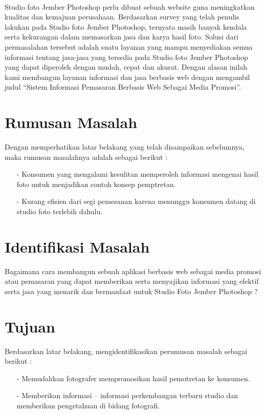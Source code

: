 \documentclass{jtetiproposalskripsi}
\begin{document}
\paragraph{}
Studio foto Jember Photoshop perlu dibuat sebuah website guna meningkatkan kualitas dan kemajuan perusahaan. Berdasarkan survey yang telah penulis lakukan pada Studio foto Jember Photoshop,  ternyata  masih  banyak kendala  serta  kekurangan dalam memasarkan jasa dan karya hasil foto. Solusi dari permasalahan tersebut adalah suatu layanan yang mampu menyediakan semua informasi tentang jasa-jasa yang tersedia  pada Studio foto Jember Photoshop yang dapat diperoleh dengan mudah, cepat dan akurat. Dengan alasan inilah kami membangun layanan informasi dan jasa berbasis web dengan mengambil  judul “Sistem Informasi Pemasaran Berbasis Web Sebagai Media Promosi”.



\section{Rumusan Masalah}
Dengan memperhatikan latar belakang yang telah disampaikan sebelumnya, maka rumusan masalahnya adalah sebagai berikut : 
\begin{itemize}
\item[-]Konsumen yang mengalami kesulitan memperoleh  informasi  mengenai hasil foto untuk menjadikan contoh konsep pemptretan.
\item[-]Kurang efisien dari segi pemesanan karena menunggu konsumen datang di studio foto terlebih dahulu.
\end{itemize}

\section{Identifikasi Masalah}
Bagaimana  cara  membangun  sebuah  aplikasi  berbasis web sebagai  media promosi atau pemasaran yang dapat memberikan serta menyajikan informasi yang efektif serta jasa yang menarik dan bermanfaat untuk Studio Foto Jember Photoshop ?

\section{Tujuan}
Berdasarkan latar belakang, mengidentifikasikan perumusan masalah sebagai berikut :
\begin{itemize}
\item[-]Memudahkan fotografer mempromosikan hasil pemotretan ke konsumen.
\item[-]Memberikan informasi – informasi perkembangan terbaru studio dan memberikan pengetahuan di bidang fotografi.
\end{itemize}
\end{document}
